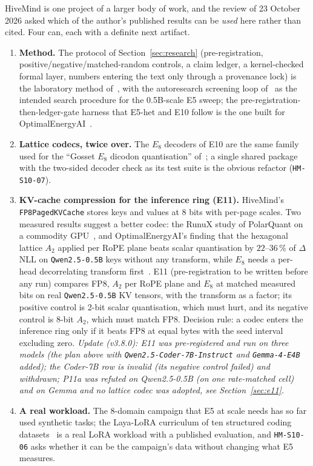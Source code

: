 \documentclass[11pt,a4paper]{article}
\begin{document}
HiveMind is one project of a larger body of work, and the review of 23 October 2026 asked which of the author's published results can be \emph{used} here rather than cited. Four can, each with a definite next artifact.
\begin{enumerate}[leftmargin=1.8em]
    \item \textbf{Method.} The protocol of Section~\ref{sec:research} (pre-registration, positive/negative/matched-random controls, a claim ledger, a kernel-checked formal layer, numbers entering the text only through a provenance lock) is the laboratory method of~\cite{callens2026labmethod}, with the autoresearch screening loop of~\cite{callens2026autoresearch} as the intended search procedure for the 0.5B-scale E5 sweep; the pre-registration-then-ledger-gate harness that E5-het and E10 follow is the one built for OptimalEnergyAI~\cite{callens2026triangular}.
    \item \textbf{Lattice codecs, twice over.} The $E_8$ decoders of E10 are the same family used for the ``Gosset $E_8$ dicodon quantisation'' of~\cite{callens2026genetics}; a single shared package with the two-sided decoder check as its test suite is the obvious refactor (\texttt{HM-S10-07}).
    \item \textbf{KV-cache compression for the inference ring (E11).} HiveMind's \texttt{FP8PagedKVCache} stores keys and values at 8 bits with per-page scales. Two measured results suggest a better codec: the RunuX study of PolarQuant on a commodity GPU~\cite{callens2026runuxkv}, and OptimalEnergyAI's finding that the hexagonal lattice $A_2$ applied per RoPE plane beats scalar quantisation by $22$--$36\,\%$ of $\Delta$NLL on \texttt{Qwen2.5-0.5B} keys without any transform, while $E_8$ needs a per-head decorrelating transform first~\cite{callens2026triangular}. E11 (pre-registration to be written before any run) compares FP8, $A_2$ per RoPE plane and $E_8$ at matched measured bits on real \texttt{Qwen2.5-0.5B} KV tensors, with the transform as a factor; its positive control is 2-bit scalar quantisation, which must hurt, and its negative control is 8-bit $A_2$, which must match FP8. Decision rule: a codec enters the inference ring only if it beats FP8 at equal bytes with the seed interval excluding zero. \emph{Update (v3.8.0): E11 was pre-registered and run on three models (the plan above with \texttt{Qwen2.5-Coder-7B-Instruct} and \texttt{Gemma-4-E4B} added); the Coder-7B row is invalid (its negative control failed) and withdrawn; P11a was refuted on Qwen2.5-0.5B (on one rate-matched cell) and on Gemma and no lattice codec was adopted, see Section~\ref{sec:e11}.}
    \item \textbf{A real workload.} The 8-domain campaign that E5 at scale needs has so far used synthetic tasks; the Laya-LoRA curriculum of ten structured coding datasets~\cite{callens2026laya} is a real LoRA workload with a published evaluation, and \texttt{HM-S10-06} asks whether it can be the campaign's data without changing what E5 measures.
\end{enumerate}
\end{document}

